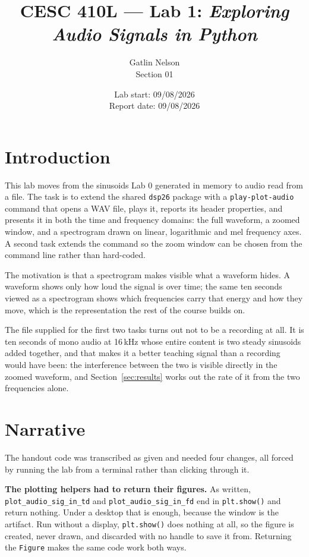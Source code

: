 \documentclass[11pt]{article}
\title{CESC 410L --- Lab 1: \textit{Exploring Audio Signals in Python}}
\author{Gatlin Nelson \\ Section 01}
\date{Lab start: 09/08/2026 \\ Report date: 09/08/2026}
\begin{document}
\maketitle

\section{Introduction}

This lab moves from the sinusoids Lab 0 generated in memory to audio read from
a file. The task is to extend the shared \texttt{dsp26} package with a
\texttt{play-plot-audio} command that opens a WAV file, plays it, reports its
header properties, and presents it in both the time and frequency domains: the
full waveform, a zoomed window, and a spectrogram drawn on linear, logarithmic
and mel frequency axes. A second task extends the command so the zoom window
can be chosen from the command line rather than hard-coded.

The motivation is that a spectrogram makes visible what a waveform hides. A
waveform shows only how loud the signal is over time; the same ten seconds
viewed as a spectrogram shows which frequencies carry that energy and how they
move, which is the representation the rest of the course builds on.

The file supplied for the first two tasks turns out not to be a recording at
all. It is ten seconds of mono audio at 16\,kHz whose entire content is two
steady sinusoids added together, and that makes it a better teaching signal
than a recording would have been: the interference between the two is visible
directly in the zoomed waveform, and Section~\ref{sec:results} works out the
rate of it from the two frequencies alone.

\section{Narrative}

The handout code was transcribed as given and needed four changes, all forced
by running the lab from a terminal rather than clicking through it.

\textbf{The plotting helpers had to return their figures.} As written,
\texttt{plot\_audio\_sig\_in\_td} and \texttt{plot\_audio\_sig\_in\_fd} end in
\texttt{plt.show()} and return nothing. Under a desktop that is enough, because
the window is the artifact. Run without a display, \texttt{plt.show()} does
nothing at all, so the figure is created, never drawn, and discarded with no
handle to save it from. Returning the \texttt{Figure} makes the same code work
both ways.
\end{document}
